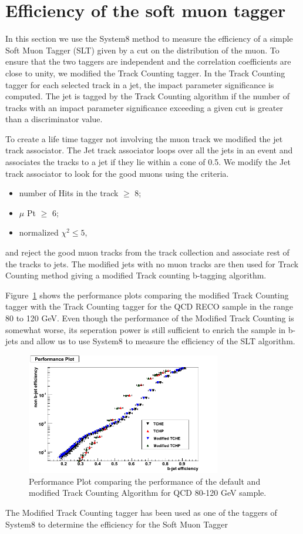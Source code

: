 \section{Efficiency of the soft muon tagger}

In this section we use the System8 method to measure the efficiency of a 
simple Soft Muon Tagger (SLT) given by a cut on the \ptrel distribution of the 
muon. To ensure that the two taggers are independent and the correlation 
coefficients are close to unity, we modified the Track Counting tagger.
In the Track Counting tagger for each selected track in a jet, the impact 
parameter significance is computed. The jet is tagged by the Track Counting 
algorithm if the number of tracks with an impact parameter significance 
exceeding a given cut is greater than a discriminator value.

To create a life time tagger not involving the muon track we modified 
the jet track associator. The Jet track associator  loops over all the jets 
in an event and associates the tracks to a jet if they lie within a cone of 
0.5. We modify the Jet track associator to look for the good muons using the
criteria.
\begin{itemize} 
\item   number of Hits in the track $ \ge $ 8;
\item   $\mu $ Pt $ \ge $ 6;
\item   normalized $\chi^{2} \le 5$,
\end{itemize}   
and reject the good muon tracks from the track collection and associate rest 
of the tracks to jets. The modified jets with no muon tracks are then used 
for Track Counting method giving a modified Track counting b-tagging algorithm.

Figure~\ref{fig:Performanceplot} shows the performance plots
 comparing the modified Track Counting tagger with the Track Counting tagger
for the QCD RECO sample in the \pt range 80 to 120 GeV. Even though the 
performance of the Modified Track Counting is somewhat worse, its seperation
power is still sufficient to enrich the sample in b-jets and allow us to use 
System8 to measure the efficiency of the SLT algorithm.


\begin{figure}[htbp]
  \begin{center}
    \includegraphics[width=85mm]{Figures/QCD_80_120.png}
  \end{center}
  \caption{Performance Plot comparing the performance of the default and 
modified Track Counting Algorithm for QCD 80-120 GeV sample.}
  \label{fig:Performanceplot}
\end{figure}


The Modified Track Counting tagger has been used as one of the taggers of
System8 to determine the efficiency for the Soft Muon Tagger




